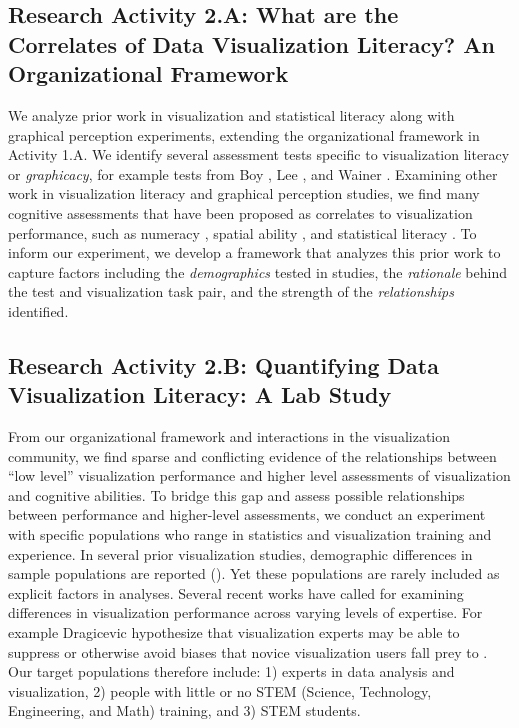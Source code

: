 \documentclass[11pt]{article}
\begin{document}
\subsection{Research Activity 2.A: What are the Correlates of Data Visualization Literacy? An Organizational Framework}
We analyze prior work in visualization and statistical literacy along with graphical perception experiments, extending the organizational framework in Activity 1.A.
We identify several assessment tests specific to visualization literacy or \emph{graphicacy}, for example tests from Boy \etal \cite{boy2014principled}, Lee \etal \cite{lee2017vlat}, and Wainer \etal \cite{wainer1980test}.
Examining other work in visualization literacy and graphical perception studies, we find many cognitive assessments that have been proposed as correlates to visualization performance, such as numeracy \cite{reyna2009numeracy, cokely2012measuring, nelson2008clinical}, spatial ability \cite{vanderplas2016spatial, ottley2016improving, trickett2006toward, hofmann2012graphical}, and statistical literacy \cite{gal2002adults, garfield2003web, shah2002review}.
To inform our experiment, we develop a framework that analyzes this prior work to capture factors including the \emph{demographics} tested in studies, the \emph{rationale} behind the test and visualization task pair, and the strength of the \emph{relationships} identified.

\subsection{Research Activity 2.B: Quantifying Data Visualization Literacy: A Lab Study}
From our organizational framework and interactions in the visualization community, we find sparse and conflicting evidence of the relationships between ``low level'' visualization performance and higher level assessments of visualization and cognitive abilities.
To bridge this gap and assess possible relationships between performance and higher-level assessments, we conduct an experiment with specific populations who range in statistics and visualization training and experience.
In several prior visualization studies, demographic differences in sample populations are reported (\eg \cite{cleveland1984graphical}).
Yet these populations are rarely included as explicit factors in analyses.
Several recent works have called for examining differences in visualization performance across varying levels of expertise.
For example Dragicevic \etal hypothesize that visualization experts may be able to suppress or otherwise avoid biases that novice visualization users fall prey to \cite{dragicevic2017blinded}.
Our target populations therefore include: 1) experts in data analysis and visualization, 2) people with little or no STEM (Science, Technology, Engineering, and Math) training, and 3) STEM students.
\end{document}
